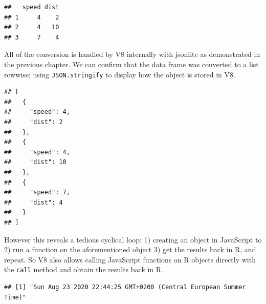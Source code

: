\documentclass[
]{krantz}
\makeatletter
\newenvironment{Shaded}{\begin{snugshade}}{\end{snugshade}}
\newcommand{\CommentTok}[1]{\textcolor[rgb]{0.37,0.37,0.37}{\textit{#1}}}
\newcommand{\DecValTok}[1]{\textcolor[rgb]{0.06,0.06,0.06}{#1}}
\newcommand{\KeywordTok}[1]{\textcolor[rgb]{0.27,0.27,0.27}{\textbf{#1}}}
\newcommand{\NormalTok}[1]{#1}
\newcommand{\OperatorTok}[1]{\textcolor[rgb]{0.43,0.43,0.43}{\textbf{#1}}}
\newcommand{\StringTok}[1]{\textcolor[rgb]{0.5,0.5,0.5}{#1}}
\newenvironment{kframe}{%
\medskip{}
\setlength{\fboxsep}{.8em}
 \def\at@end@of@kframe{}%
 \ifinner\ifhmode%
  \def\at@end@of@kframe{\end{minipage}}%
  \begin{minipage}{\columnwidth}%
 \fi\fi%
 \def\FrameCommand##1{\hskip\@totalleftmargin \hskip-\fboxsep
 \colorbox{shadecolor}{##1}\hskip-\fboxsep
     \hskip-\linewidth \hskip-\@totalleftmargin \hskip\columnwidth}%
 \MakeFramed {\advance\hsize-\width
   \@totalleftmargin\z@ \linewidth\hsize
   \@setminipage}}%
 {\par\unskip\endMakeFramed%
 \at@end@of@kframe}
\renewenvironment{Shaded}{\begin{kframe}}{\end{kframe}}
\makeatother
\begin{document}
\begin{Shaded}
\end{Shaded}

\begin{verbatim}
##   speed dist
## 1     4    2
## 2     4   10
## 3     7    4
\end{verbatim}

All of the conversion is handled by V8 internally with jsonlite as demonstrated in the previous chapter. We can confirm that the data frame was converted to a list rowwise; using \texttt{JSON.stringify} to display how the object is stored in V8.

\begin{Shaded}
\end{Shaded}

\begin{verbatim}
## [
##   {
##     "speed": 4,
##     "dist": 2
##   },
##   {
##     "speed": 4,
##     "dist": 10
##   },
##   {
##     "speed": 7,
##     "dist": 4
##   }
## ]
\end{verbatim}

However this reveals a tedious cyclical loop: 1) creating an object in JavaScript to 2) run a function on the aforementioned object 3) get the results back in R, and repeat. So V8 also allows calling JavaScript functions on R objects directly with the \texttt{call} method and obtain the results back in R.

\begin{Shaded}
\end{Shaded}

\begin{verbatim}
## [1] "Sun Aug 23 2020 22:44:25 GMT+0200 (Central European Summer Time)"
\end{verbatim}
\end{document}

